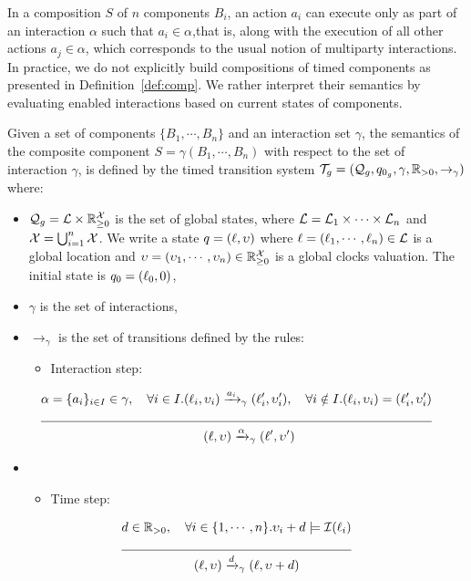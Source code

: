 In a composition $S$ of $n$ components $B_i$, an action $a_i$ can execute only as part
of an interaction $\alpha$ such that $a_i\in\alpha$,that is, along with the 
execution of all other actions $a_j\in\alpha$, which corresponds to the usual 
notion of multiparty interactions.
In practice, we do not explicitly build compositions of timed components as 
presented in Definition~\ref{def:comp}. We rather interpret their semantics by 
evaluating enabled interactions based on current states of components. 
\begin{property}\label{pr:std_sem}
  Given a set of components $\{B_1,\cdots,B_n\}$ and an interaction set $\gamma$,
  the semantics of the composite component $S=\gamma(B_1,\cdots,B_n)$
  with respect to the set of interaction $\gamma$, is defined by 
  the timed transition system $\mathcal{T}_g=(\mathcal{Q}_g,q_{0_g},\gamma,\mathbb{R}_{> 0},\to_{\gamma})$ where:
  \begin{itemize}
    \item $\mathcal{Q}_g=\mathcal{L}\times\mathbb{R}_{\ge 0}^{\mathcal{X}}$ is the set of global states, where
      $\mathcal{L}=\mathcal{L}_1\times\cdots\times\mathcal{L}_n$ and $\mathcal{X}=\bigcup_{i=1}^n\mathcal{X}$.
      We write a state $q=(\ell,\upsilon)$ where $\ell=(\ell_1,\cdots,\ell_n)\in\mathcal{L}$
      is a global location and $\upsilon=(\upsilon_1,\cdots,\upsilon_n)\in\mathbb{R}_{\ge 0}^{\mathcal{X}}$ is a global 
      clocks valuation. The initial state is $q_0=(\ell_0,0)$,
    \item $\gamma$ is the set of interactions,
    \item $\to_{\gamma}$ is the set of transitions defined by the rules:
    \begin{itemize}
      \item Interaction step: \\
      \end{itemize}
  \end{itemize}
  \vspace*{-1cm}
  \begin{align*}
    & \alpha=\{a_i\}_{i\in I}\in\gamma,\quad\forall i\in{I}.(\loc_i,\val_i)
    \transitb{a_i}{\gamma}(\loc'_i,\val'_i),\quad\forall i\notin{I}.
    (\loc_i,\val_i)=(\loc'_i,\val'_i)\\
    \cline{1-2}
   &\hspace{4.5cm}(\loc,\val)\transitb{\alpha}{\gamma}(\loc',\val')
 \end{align*}
  \vspace*{-1.5cm}
  \begin{itemize}
    \item[] 
      \begin{itemize}
      \item Time step:
    \end{itemize}
  \end{itemize}
  \vspace*{-5mm}
  \begin{align*}
    & d\in\realpos,\quad\forall i\in\{1,\cdots,n\}
    .\val_i+d\models\Inv{\loc_i}\\
    \cline{1-2}
   &\hspace{2cm}(\loc,\val)\transitb{d}{\gamma}(\loc,\val+d)
 \end{align*}
\end{property}

